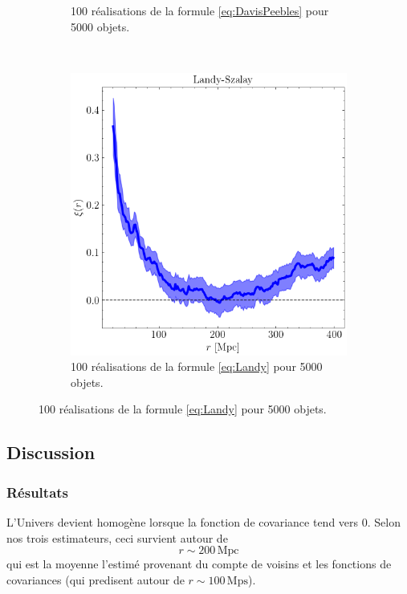 \documentclass{article}
\numberwithin{equation}{section}
\begin{document}
\begin{figure}[H]
\begin{subfigure}[t]{0.3\textwidth}
                \caption{100 réalisations de la formule \eqref{eq:DavisPeebles} pour 5000 objets.}
                \label{fig:Peebles}
        \end{subfigure}
        ~
       \begin{subfigure}[t]{0.3\textwidth}
                \includegraphics[width=\textwidth]{coorelation_Landy-Szalay}
                \caption{100 réalisations de la formule \eqref{eq:Landy} pour 5000 objets.}
                \label{fig:Landy}
        \end{subfigure}

\end{figure}


\subsection{Discussion}
\subsubsection{Résultats}
L'Univers devient homogène lorsque la fonction de covariance tend vers 0. Selon nos trois estimateurs, 
ceci survient autour de 
\[
        \boxed{r \sim 200\, \text{Mpc}}
\]
qui est la moyenne l'estimé provenant du compte de voisins et les fonctions de covariances (qui predisent 
autour de $r \sim 100\, \text{Mps}$).
\end{document}
